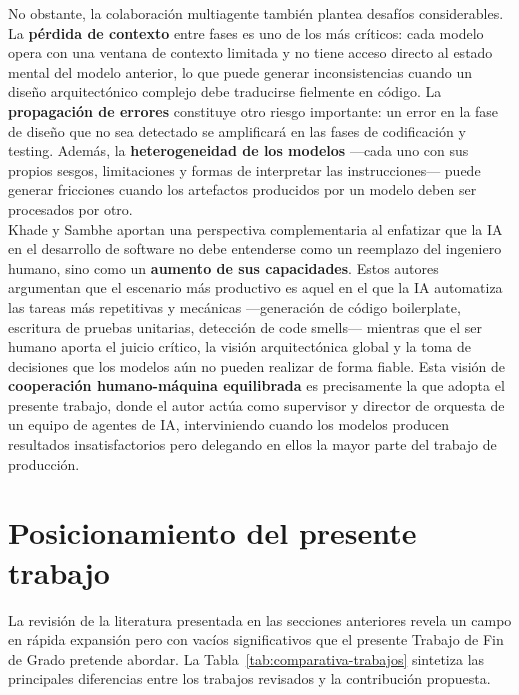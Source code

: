 No obstante, la colaboración multiagente también plantea desafíos considerables. La \textbf{pérdida de contexto} entre fases es uno de los más críticos: cada modelo opera con una ventana de contexto limitada y no tiene acceso directo al estado mental del modelo anterior, lo que puede generar inconsistencias cuando un diseño arquitectónico complejo debe traducirse fielmente en código. La \textbf{propagación de errores} constituye otro riesgo importante: un error en la fase de diseño que no sea detectado se amplificará en las fases de codificación y testing. Además, la \textbf{heterogeneidad de los modelos} ---cada uno con sus propios sesgos, limitaciones y formas de interpretar las instrucciones--- puede generar fricciones cuando los artefactos producidos por un modelo deben ser procesados por otro.\\

Khade y Sambhe \cite{Khade:2025:AIinSD} aportan una perspectiva complementaria al enfatizar que la \ac{IA} en el desarrollo de software no debe entenderse como un reemplazo del ingeniero humano, sino como un \textbf{aumento de sus capacidades}. Estos autores argumentan que el escenario más productivo es aquel en el que la \ac{IA} automatiza las tareas más repetitivas y mecánicas ---generación de código boilerplate, escritura de pruebas unitarias, detección de code smells--- mientras que el ser humano aporta el juicio crítico, la visión arquitectónica global y la toma de decisiones que los modelos aún no pueden realizar de forma fiable. Esta visión de \textbf{cooperación humano-máquina equilibrada} es precisamente la que adopta el presente trabajo, donde el autor actúa como supervisor y director de orquesta de un equipo de agentes de \ac{IA}, interviniendo cuando los modelos producen resultados insatisfactorios pero delegando en ellos la mayor parte del trabajo de producción.\\

\section{Posicionamiento del presente trabajo} \label{sec:posicionamiento}

La revisión de la literatura presentada en las secciones anteriores revela un campo en rápida expansión pero con vacíos significativos que el presente Trabajo de Fin de Grado pretende abordar. La Tabla~\ref{tab:comparativa-trabajos} sintetiza las principales diferencias entre los trabajos revisados y la contribución propuesta.\\

